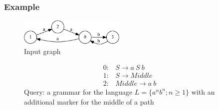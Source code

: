 \documentclass{beamer}
\begin{document}
\begin{frame}
  \transwipe[direction=90]
  \frametitle{Example}
\begin{figure}[ht]
    \centering
        \includegraphics[width=0.45\textwidth]{pictures/input.pdf}\\
        Input graph
\end{figure}
\begin{figure}[ht]
\centering
   \[
\begin{array}{rl} 
   0:& S \rightarrow a \ S \ b \\
   1:& S \rightarrow Middle \\
   2:& Middle \rightarrow a \ b
\end{array}
\]
   Query: a grammar for the language $L=\{a^n b^n; n \geq 1\}$ with an additional marker for the middle of a path
   \label{grammarG}        
    \end{figure}
\end{frame}
\end{document}
